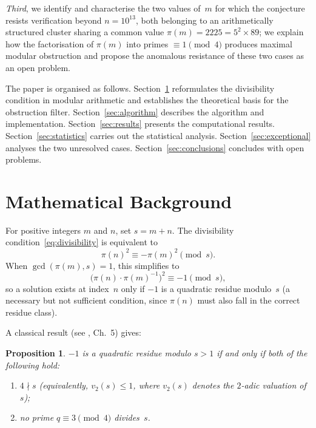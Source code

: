 \documentclass{amsart}
\newtheorem{proposition}[theorem]{Proposition}
\theoremstyle{definition}
\theoremstyle{remark}
\numberwithin{equation}{section}
\newcommand{\vq}[1]{v_{#1}}
\begin{document}
\emph{Third}, we identify and characterise the two values of~$m$ for
which the conjecture resists verification beyond $n = 10^{13}$,
both belonging to an arithmetically structured cluster sharing a
common value $\pi(m) = 2225 = 5^2 \times 89$; we explain how the
factorisation of $\pi(m)$ into primes $\equiv 1 \pmod{4}$ produces
maximal modular obstruction and propose the anomalous resistance of
these two cases as an open problem.

The paper is organised as follows.
Section~\ref{sec:background} reformulates the divisibility condition
in modular arithmetic and establishes the theoretical basis for the
obstruction filter.
Section~\ref{sec:algorithm} describes the algorithm and implementation.
Section~\ref{sec:results} presents the computational results.
Section~\ref{sec:statistics} carries out the statistical analysis.
Section~\ref{sec:exceptional} analyses the two unresolved cases.
Section~\ref{sec:conclusions} concludes with open problems.

\section{Mathematical Background}
\label{sec:background}

For positive integers $m$ and $n$, set $s = m + n$.
The divisibility condition~\eqref{eq:divisibility} is equivalent to
\begin{equation}\label{eq:modular}
\pi(n)^2 \equiv -\pi(m)^2 \pmod{s}.
\end{equation}
When $\gcd(\pi(m), s) = 1$, this simplifies to
\begin{equation}\label{eq:qr}
\bigl(\pi(n) \cdot \pi(m)^{-1}\bigr)^2 \equiv -1 \pmod{s},
\end{equation}
so a solution exists at index~$n$ only if $-1$ is a quadratic
residue modulo~$s$ (a necessary but not sufficient condition, since
$\pi(n)$ must also fall in the correct residue class).

A classical result (see \cite{IrelandRosen}, Ch.~5) gives:

\begin{proposition}\label{prop:qr}
$-1$ is a quadratic residue modulo $s > 1$ if and only if both
of the following hold:
\begin{enumerate}
\item[\textup{(a)}] $4 \nmid s$
\textup{(}equivalently, $\vq{2}(s) \le 1$,
where $\vq{2}(s)$ denotes the $2$-adic valuation of~$s$\textup{)};
\item[\textup{(b)}] no prime $q \equiv 3 \pmod{4}$ divides~$s$.
\end{enumerate}
\end{proposition}
\end{document}
